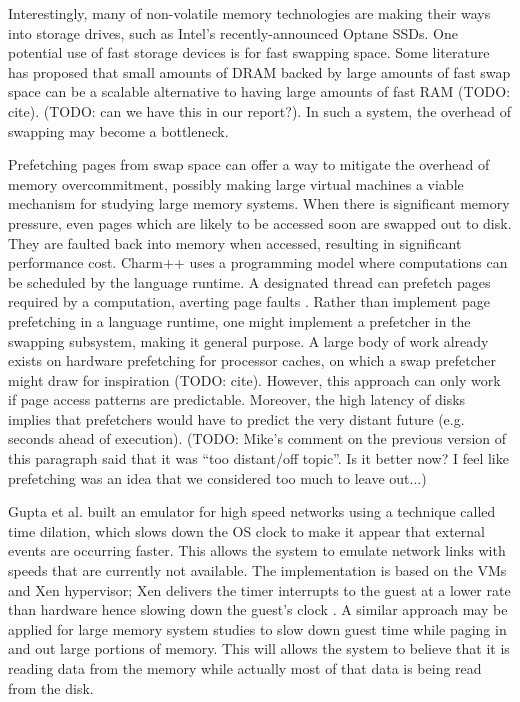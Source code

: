 \documentclass[twocolumn,11pt]{article}
\begin{document}
Interestingly, many of non-volatile memory technologies are making their ways
into storage drives, such as Intel's recently-announced Optane SSDs. One
potential use of fast storage devices is for fast swapping space. Some
literature has proposed that small amounts of DRAM backed by large amounts of
fast swap space can be a scalable alternative to having large amounts of fast
RAM (TODO: cite). (TODO: can we have this in our report?). In such a system,
the overhead of swapping may become a bottleneck.

Prefetching pages from swap space can offer a way to mitigate the overhead of
memory overcommitment, possibly making large virtual machines a viable
mechanism for studying large memory systems. When there is significant memory
pressure, even pages which are likely to be accessed soon are swapped out to
disk. They are faulted back into memory when accessed, resulting in significant
performance cost.  Charm++ uses a programming model where computations can be
scheduled by the language runtime. A designated thread can prefetch pages
required by a computation, averting page faults \cite{charmpp}. Rather than
implement page prefetching in a language runtime, one might implement a
prefetcher in the swapping subsystem, making it general purpose. A large body
of work already exists on hardware prefetching for processor caches, on which a
swap prefetcher might draw for inspiration (TODO: cite). However, this approach
can only work if page access patterns are predictable. Moreover, the high
latency of disks implies that prefetchers would have to predict the very
distant future (e.g. seconds ahead of execution). (TODO: Mike's comment on the
previous version of this paragraph said that it was ``too distant/off topic''.
Is it better now? I feel like prefetching was an idea that we considered too
much to leave out...)

Gupta et al. built an emulator for high speed networks using a technique called
time dilation, which slows down the OS clock to make it appear that external
events are occurring faster. This allows the system to emulate network links
with speeds that are currently not available. The implementation is based on
the VMs and Xen hypervisor; Xen delivers the timer interrupts to the guest at a
lower rate than hardware hence  slowing down the guest’s clock \cite{timedil}.
A similar approach may be applied for large memory system studies to slow down
guest time while paging in and out large portions of memory. This will allows
the system to believe that it is reading data from the memory while actually
most of that data is being read from the disk.
\end{document}
